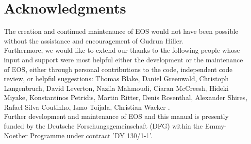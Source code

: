 \chapter{Acknowledgments}

The creation and continued maintenance of EOS would not have been possible without
the assistance and encouragement of Gudrun Hiller.\\

Furthermore, we would like to extend our thanks to the following people
whose input and support were most helpful either the development or the
maintenance of EOS, either through personal contributions to the code,
independent code review, or helpful suggestions:
Thomas Blake,
Daniel Greenwald,
Christoph Langenbruch,
David Leverton,
Nazila Mahmoudi,
Ciaran McCreesh,
Hideki Miyake,
Konstantinos Petridis,
Martin Ritter,
Denis Rosenthal,
Alexander Shires,
Rafael Silva Coutinho,
Ismo Toijala,
Christian Wacker
.\\

Further development and maintenance of EOS and this manual is presently funded by the
Deutsche Forschungsgemeinschaft (DFG) within the Emmy-Noether Programme under contract
'DY 130/1-1'.
